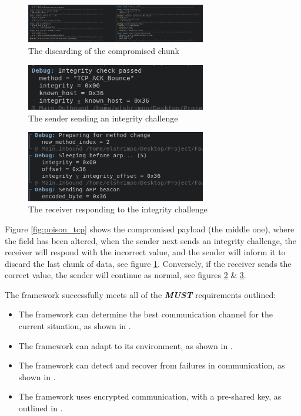 \begin{figure}
    \centering
    \includegraphics[width=0.7\textwidth]{fig/discard_posioned_chunk.png}
    \caption{The discarding of the compromised chunk}
    \label{fig:discard_poison}
\end{figure}


\begin{figure}
    \centering
    \includegraphics[width=0.7\textwidth]{fig/integrity_challenge.png}
    \caption{The sender sending an integrity challenge}
    \label{fig:integrity_challenge}
\end{figure}

\begin{figure}
    \centering
    \includegraphics[width=0.7\textwidth]{fig/integrity_response.png}
    \caption{The receiver responding to the integrity challenge}
    \label{fig:integrity_response}
\end{figure}

Figure \ref{fig:poison_tcp} shows the compromised payload (the middle one), where the field has been altered, when the sender next sends an integrity challenge, the receiver will respond with the incorrect value, and the sender will inform it to discard the last chunk of data, see figure \ref{fig:discard_poison}. Conversely, if the receiver sends the correct value, the sender will continue as normal, see figures \ref{fig:integrity_challenge} \& \ref{fig:integrity_response}.

The framework successfully meets all of the \textit{\textbf{MUST}} requirements outlined:

\begin{itemize}
    \item The framework can determine the best communication channel for the current situation, as shown in .
    \item The framework can adapt to its environment, as shown in .
    \item The framework can detect and recover from failures in communication, as shown in .
    \item The framework uses encrypted communication, with a pre-shared key, as outlined in .
\end{itemize}

